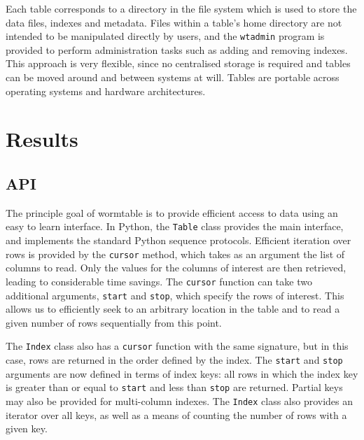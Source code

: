 \documentclass[10pt]{bmc_article}
\newenvironment{bmcformat}{\begin{raggedright}\baselineskip20pt\sloppy\setboolean{publ}{false}}{\end{raggedright}\baselineskip20pt\sloppy}
\begin{document}
\begin{bmcformat}
Each table corresponds to a directory in the file system
which is used to store the data files, indexes and metadata.
Files within a table's home directory are not intended to be 
manipulated directly by users, and the \texttt{wtadmin} program is provided 
to perform administration tasks such as adding and removing 
indexes. This approach is 
very flexible, since no centralised storage is required and 
tables can be moved around and between systems at will.
Tables are portable across operating systems and hardware
architectures.


\section*{Results}

%
\subsection*{API}
The principle goal of wormtable is to provide efficient access to data 
using an easy to learn interface. 
In Python, the \texttt{Table} class provides the main interface,
and implements the standard Python sequence protocols. Efficient 
iteration over rows is provided by the \texttt{cursor} method, 
which takes as an argument the list of columns to read.
Only the values for the columns 
of interest are then retrieved, leading to considerable
time savings. The \texttt{cursor} function can take two additional 
arguments, \texttt{start} and \texttt{stop}, which specify 
the rows of interest. This allows us to efficiently seek to an 
arbitrary location in the table and to read a given number 
of rows sequentially from this point.

The \texttt{Index} class also has a \texttt{cursor} function
with the same signature, but in this case, rows 
are returned in the order defined by the index. The  
\texttt{start} and \texttt{stop} arguments are now defined 
in terms of index keys: all rows in which the index key
is greater than or equal to \texttt{start} and less 
than \texttt{stop} are returned. Partial keys may also be 
provided for multi-column indexes. The \texttt{Index} 
class also provides an iterator over all keys, as well 
as a means of counting the number of rows with a given 
key.


\end{bmcformat}
\end{document}
